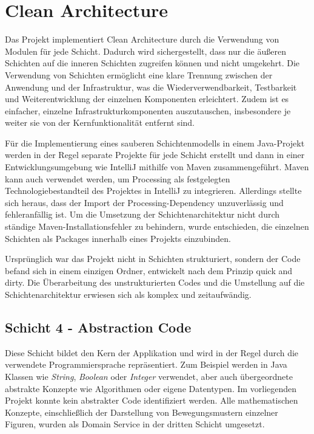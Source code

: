 \chapter{Clean Architecture}
\label{txt:ca}

Das Projekt implementiert Clean Architecture durch die Verwendung von Modulen für jede Schicht. 
Dadurch wird sichergestellt, dass nur die äußeren Schichten auf die inneren Schichten zugreifen können und nicht umgekehrt. 
Die Verwendung von Schichten ermöglicht eine klare Trennung zwischen der Anwendung und der Infrastruktur, was die Wiederverwendbarkeit, Testbarkeit und Weiterentwicklung der einzelnen Komponenten erleichtert. 
Zudem ist es einfacher, einzelne Infrastrukturkomponenten auszutauschen, insbesondere je weiter sie von der Kernfunktionalität entfernt sind.

Für die Implementierung eines sauberen Schichtenmodells in einem Java-Projekt werden in der Regel separate Projekte für jede Schicht erstellt und dann in einer Entwicklungsumgebung wie IntelliJ mithilfe von Maven zusammengeführt. 
Maven kann auch verwendet werden, um Processing als festgelegten Technologiebestandteil des Projektes in IntelliJ zu integrieren. 
Allerdings stellte sich heraus, dass der Import der Processing-Dependency unzuverlässig und fehleranfällig ist. 
Um die Umsetzung der Schichtenarchitektur nicht durch ständige Maven-Installationsfehler zu behindern, wurde entschieden, die einzelnen Schichten als Packages innerhalb eines Projekts einzubinden.

Ursprünglich war das Projekt nicht in Schichten strukturiert, sondern der Code befand sich in einem einzigen Ordner, entwickelt nach dem Prinzip \glqq quick and dirty\grqq. 
Die Überarbeitung des unstrukturierten Codes und die Umstellung auf die Schichtenarchitektur erwiesen sich als komplex und zeitaufwändig.

\newpage

\section{Schicht 4 - Abstraction Code}

Diese Schicht bildet den Kern der Applikation und wird in der Regel durch die verwendete Programmiersprache repräsentiert. 
Zum Beispiel werden in Java Klassen wie \textit{String}, \textit{Boolean} oder \textit{Integer} verwendet, aber auch übergeordnete abstrakte Konzepte wie Algorithmen oder eigene Datentypen. 
Im vorliegenden Projekt konnte kein abstrakter Code identifiziert werden.
Alle mathematischen Konzepte, einschließlich der Darstellung von Bewegungsmustern einzelner Figuren, wurden als Domain Service in der dritten Schicht umgesetzt.

